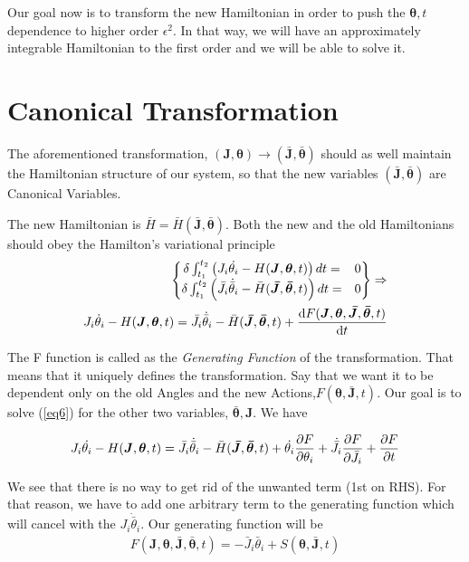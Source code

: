 	Our goal now is to transform the new Hamiltonian in order to push the $\bm{\theta},t$ dependence to higher order $\epsilon ^2$. In that way, we will have an approximately integrable Hamiltonian to the first order and we will be able to solve it. 
	
	\section{Canonical Transformation}
	
	The aforementioned transformation, $(\bm{J},\bm{\theta})\rightarrow(\bm{\bar{J}},\bm{\bar{\theta}})$ should as well maintain the Hamiltonian structure of our system, so that the new variables $(\bm{\bar{J}},\bm{\bar{\theta}})$ are Canonical Variables.
	
	The new Hamiltonian is $\bar{H} = \bar{H}(\bm{\bar{J}},\bm{\bar{\theta}})$. Both the new and the old Hamiltonians should obey the Hamilton's variational principle 
	\begin{align}\label{eq6}
		\left\{
		\begin{matrix}
				\delta\int_{t_1}^{t_2}\left( J_i \dot{\theta_i} - H(\bm{J},\bm{\theta},t)\right)dt =& 0\\
				 \delta\int_{t_1}^{t_2}\left( \bar{J}_i \dot{\bar{\theta}}_i - \bar{H}(\bm{\bar{J}},\bm{\bar{\theta}},t)\right)dt =& 0
		\end{matrix}  \right\}\Rightarrow \nonumber \\
		J_i \dot{\theta}_i - H(\bm{J},\bm{\theta},t) =\bar{J}_i \dot{\bar{\theta}}_i - \bar{H}(\bm{\bar{J}},\bm{\bar{\theta}},t) + \odv{F(\bm{J},\bm{\theta},\bm{\bar{J}},\bm{\bar{\theta}},t)}{t} 
	\end{align}
	
	The F function is called as the \textit{Generating Function} of the transformation. That means that it uniquely defines the transformation. Say that we want it to be dependent only on the old Angles and the new Actions,$F(\bm{\theta},\bm{\bar{J}},t)$. Our goal is to solve (\ref{eq6}) for the other two variables, $\bm{\bar{\theta}},\bm{J}$. We have  
	
		\begin{align*}
			J_i\dot{\theta_i}- H(\bm{J},\bm{\theta},t) =\bar{J}_i \dot{\bar{\theta}}_i - \bar{H}(\bm{\bar{J}},\bm{\bar{\theta}},t) + \dot{\theta_i}\pdv{F}{\theta_i} + \dot{\bar{J}}_i\pdv{F}{\bar{J}_i} + \pdv{F}{t}
		\end{align*}
	
	We see that there is no way to get rid of the unwanted term (1st on RHS). For that reason, we have to add one arbitrary term to the generating function which will cancel with the $J_i\dot{\bar{\theta}}_i$. Our generating function will be 
		\begin{align}
			F(\bm{J},\bm{\theta},\bm{\bar{J}},\bm{\bar{\theta}},t) = -\bar{J}_i\bar{\theta}_i + S(\bm{\theta},\bm{\bar{J}},t)
		\end{align}
	
